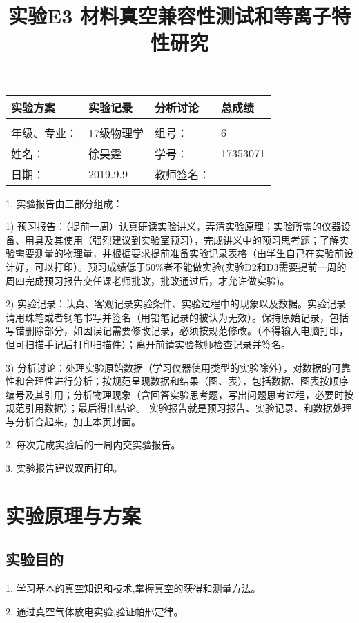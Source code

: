 \documentclass{article}
\title{实验E3 材料真空兼容性测试和等离子特性研究}
\begin{document}
\maketitle

\begin{tabular}{|p{8em}|p{8em}|p{8em}|p{6em}|}
\hline
		\large{实验方案} &\large{实验记录}  &\large{分析讨论} &\large{总成绩}\\
		\hline
		        &          &          &  \\
	    \hline
	\hline 
	年级、专业： &17级物理学 &组号：& 6 \\
	\hline
	姓名：& 徐昊霆 &学号：&17353071  \\
	\hline
	日期：& 2019.9.9 &教师签名： &  \\
    \hline	
        \end{tabular}
        
        1. 实验报告由三部分组成：
        
        1) 预习报告：（提前一周）认真研读实验讲义，弄清实验原理；实验所需的仪器设备、用具及其使用（强烈建议到实验室预习），完成讲义中的预习思考题；了解实验需要测量的物理量，并根据要求提前准备实验记录表格（由学生自己在实验前设计好，可以打印）。预习成绩低于50\%者不能做实验(实验D2和D3需要提前一周的周四完成预习报告交任课老师批改，批改通过后，才允许做实验)。
        
        2) 实验记录：认真、客观记录实验条件、实验过程中的现象以及数据。实验记录请用珠笔或者钢笔书写并签名（用铅笔记录的被认为无效）。保持原始记录，包括写错删除部分，如因误记需要修改记录，必须按规范修改。（不得输入电脑打印，但可扫描手记后打印扫描件）；离开前请实验教师检查记录并签名。
        
    3) 分析讨论：处理实验原始数据（学习仪器使用类型的实验除外），对数据的可靠性和合理性进行分析；按规范呈现数据和结果（图、表），包括数据、图表按顺序编号及其引用；分析物理现象（含回答实验思考题，写出问题思考过程，必要时按规范引用数据）；最后得出结论。
    实验报告就是预习报告、实验记录、和数据处理与分析合起来，加上本页封面。
    
    2. 每次完成实验后的一周内交实验报告。
    
    3. 实验报告建议双面打印。
\newpage
\tableofcontents
\section{实验原理与方案}

\subsection{实验目的}
\par 
1. 学习基本的真空知识和技术,掌握真空的获得和测量方法。
\par
2. 通过真空气体放电实验,验证帕邢定律。
\end{document}
